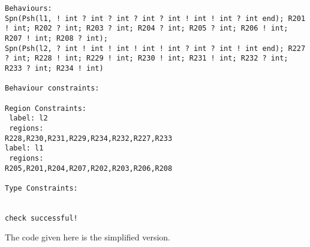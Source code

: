 \begin{lstlisting}
Behaviours:
Spn(Psh(l1, ! int ? int ? int ? int ? int ! int ! int ? int end); R201 ! int; R202 ? int; R203 ? int; R204 ? int; R205 ? int; R206 ! int; R207 ! int; R208 ? int); 
Spn(Psh(l2, ? int ! int ! int ! int ! int ? int ? int ! int end); R227 ? int; R228 ! int; R229 ! int; R230 ! int; R231 ! int; R232 ? int; R233 ? int; R234 ! int)

Behaviour constraints:

Region Constraints:
 label: l2
 regions:
R228,R230,R231,R229,R234,R232,R227,R233
label: l1
 regions:
R205,R201,R204,R207,R202,R203,R206,R208

Type Constraints:
 

check successful!

\end{lstlisting}

The code given here is the simplified version. 